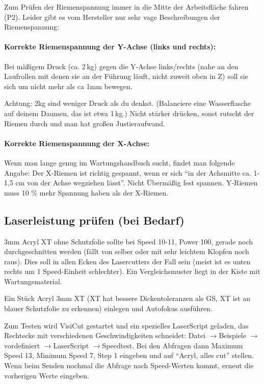 \documentclass{\basedir/fablab-document}
\newcommand{\pfeil}{\ensuremath{\rightarrow}}
\begin{document}
	Zum Prüfen der Riemenspannung immer in die Mitte der Arbeitsfläche fahren (P2). Leider gibt es vom Hersteller nur sehr vage Beschreibungen der Riemenspannung:
	
	\paragraph{Korrekte Riemenspannung der Y-Achse (links und rechts):} Bei mäßigem Druck (ca. 2\,kg) gegen die Y-Achse links/rechts (nahe an den Laufrollen mit denen sie an der Führung läuft, nicht zuweit oben in Z) soll sie sich um nicht mehr als ca 1mm bewegen.
	
	Achtung: 2kg sind weniger Druck als du denkst. (Balanciere eine Wasserflasche auf deinem Daumen, das ist etwa 1\,kg.) Nicht stärker drücken, sonst rutscht der Riemen durch und man hat großen Justieraufwand. 
	
	\paragraph{Korrekte Riemenspannung der X-Achse:} Wenn man lange genug im Wartungshandbuch sucht, findet man folgende Angabe: Der X-Riemen ist richtig gespannt, wenn er sich \enquote{in der Achsmitte ca. 1-1,5 cm von der Achse wegziehen lässt}. Nicht Übermäßig fest spannen. Y-Riemen muss 10 \% mehr Spannung haben als der X-Riemen.

\subsection{Laserleistung prüfen (bei Bedarf)}
3mm Acryl XT ohne Schutzfolie sollte bei Speed 10-11, Power 100, gerade noch durchgeschnitten werden (fällt von selber oder mit sehr leichtem Klopfen noch raus). Dies soll in allen Ecken des Lasercutters der Fall sein (meist ist es unten rechts um 1 Speed-Einheit schlechter). Ein Vergleichsmuster liegt in der Kiste mit Wartungsmaterial.

Ein Stück Acryl 3mm XT (XT hat bessere Dickentoleranzen als GS, XT ist an blauer Schutzfolie zu erkennen) einlegen und Autofokus ausführen.

Zum Testen wird VisiCut gestartet und ein spezielles LaserScript geladen, das Rechtecke mit verschiedenen Geschwindigkeiten schneidet: Datei \pfeil Beispiele \pfeil vordefiniert \pfeil LaserScript \pfeil Speedtest. Bei den Abfragen dann Maximum Speed 13, Minimum Speed 7, Step 1 eingeben und auf \enquote{Acryl, alles cut} stellen. Wenn beim Senden nochmal die Abfrage nach Speed-Werten kommt, erneut die vorherigen Werte eingeben.
\end{document}

